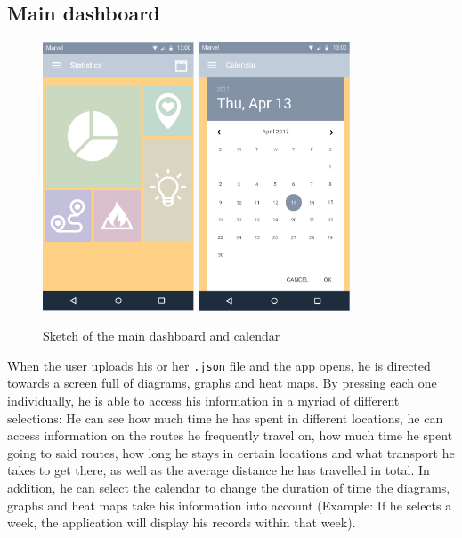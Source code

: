 \documentclass[12p]{article}
\begin{document}
	\subsection{Main dashboard}
	\begin{figure}[ht]
	    \center
        \includegraphics[height=8cm,keepaspectratio]{pics/app_design/main.PNG}
        \includegraphics[height=8cm,keepaspectratio]{pics/app_design/calendar.PNG}
        \caption{Sketch of the main dashboard and calendar}
    \end{figure}
	When the user uploads his or her \texttt{.json} file and the app opens, he is directed towards a screen full of diagrams, graphs and heat maps. By pressing each one individually, he is able to access his information in a myriad of different selections: He can see how much time he has spent in different locations, he can access information on the routes he frequently travel on, how much time he spent going to said routes, how long he stays in certain locations and what transport he takes to get there, as well as the average distance he has travelled in total. In addition, he can select the calendar to change the duration of time the diagrams, graphs and heat maps take his information into account (Example: If he selects a week, the application will display his records within that week).
	
\end{document}
